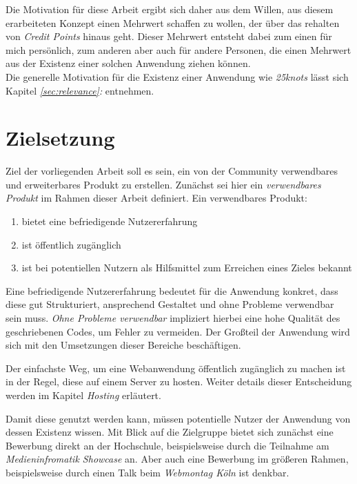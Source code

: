 Die Motivation für diese Arbeit ergibt sich daher aus dem Willen, aus diesem erarbeiteten Konzept einen Mehrwert schaffen zu wollen, der über das rehalten von \textit{Credit Points} hinaus geht. Dieser Mehrwert entsteht dabei zum einen für mich persönlich, zum anderen aber auch für andere Personen, die einen Mehrwert aus der Existenz einer solchen Anwendung ziehen können.\\
Die generelle Motivation für die Existenz einer Anwendung wie \textit{25knots} lässt sich Kapitel \textit{\ref{sec:relevance}: } entnehmen.

\section{Zielsetzung}
Ziel der vorliegenden Arbeit soll es sein, ein von der Community verwendbares und erweiterbares Produkt zu erstellen. Zunächst sei hier ein \textit{verwendbares Produkt} im Rahmen dieser Arbeit definiert. Ein verwendbares Produkt:

\begin{enumerate}
  \item bietet eine befriedigende Nutzererfahrung
  \item ist öffentlich zugänglich
  \item ist bei potentiellen Nutzern als Hilfsmittel zum Erreichen eines Zieles bekannt
\end{enumerate}

Eine befriedigende Nutzererfahrung bedeutet für die Anwendung konkret, dass diese gut Strukturiert, ansprechend Gestaltet und ohne Probleme verwendbar sein muss. \textit{Ohne Probleme verwendbar} impliziert hierbei eine hohe Qualität des geschriebenen Codes, um Fehler zu vermeiden. Der Großteil der Anwendung wird sich mit den Umsetzungen dieser Bereiche beschäftigen.

Der einfachste Weg, um eine Webanwendung öffentlich zugänglich zu machen ist in der Regel, diese auf einem Server zu hosten. Weiter details dieser Entscheidung werden im Kapitel \textit{Hosting} erläutert.

Damit diese genutzt werden kann, müssen potentielle Nutzer der Anwendung von dessen Existenz wissen. Mit Blick auf die Zielgruppe bietet sich zunächst eine Bewerbung direkt an der Hochschule, beispielsweise durch die Teilnahme am \textit{Medieninfromatik Showcase} an. Aber auch eine Bewerbung im größeren Rahmen, beispielsweise durch einen Talk beim \textit{Webmontag Köln} ist denkbar.\\

